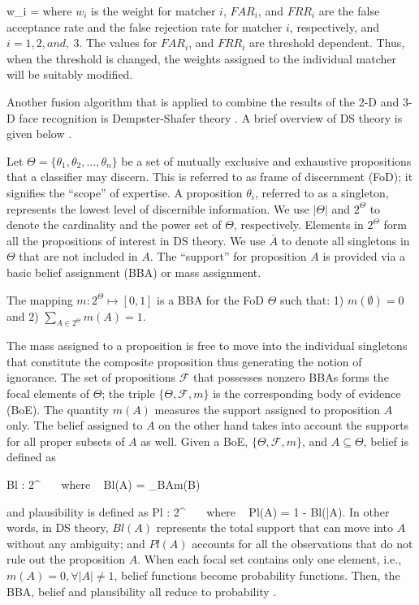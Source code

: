 \beq \label{eq_fusion_weights}\displaystyle w_i =  \eeq where $w_i$ is the
weight for matcher $i$, $FAR_i$, and $FRR_i$ are the false
acceptance rate and the false rejection rate for matcher $i$,
respectively, and $i = 1, 2, and,~ 3$. The values for $FAR_i$, and
$FRR_i$ are threshold dependent. Thus, when the threshold is
changed, the weights assigned to the individual matcher will be
suitably modified.

Another fusion algorithm that is applied to combine the results of
the 2-D and 3-D face recognition is Dempster-Shafer theory
\cite{Shafer76}. A brief overview of DS theory is given below
\cite{premaratne07}.

Let $\Theta = \{\theta_1, \theta_2, ..., \theta_n\}$ be a set of
mutually exclusive and exhaustive propositions that a classifier may
discern. This is referred to as frame of discernment (FoD); it
signifies the ``scope'' of expertise. A proposition $\theta_i$,
referred to as a singleton, represents the lowest level of
discernible information. We use $|\Theta|$ and $2^\Theta$ to denote
the cardinality and the power set of $\Theta$, respectively.
Elements in $2^{\Theta}$ form all the propositions of interest in DS
theory. We use $\bar{A}$ to denote all singletons in $\Theta$ that
are not included in $A$. The ``support'' for proposition $A$ is
provided via a basic belief assignment (BBA) or mass assignment.

The mapping $m : 2^\Theta \longmapsto [0, 1]$ is a BBA for the FoD
$\Theta$ such that: 1) $m(\emptyset) = 0$ and 2) $\sum_{A
\in2^\Theta}m(A) = 1$.

The mass assigned to a proposition is free to move into the
individual singletons that constitute the composite proposition thus
generating the notion of ignorance. The set of propositions
$\mathcal{F}$ that possesses nonzero BBAs forms the focal elements
of $\Theta$; the triple $\{\Theta,\mathcal{F},m\}$ is the
corresponding body of evidence (BoE). The quantity $m(A)$ measures
the support assigned to proposition $A$ only. The belief assigned to
$A$ on the other hand takes into account the supports for all proper
subsets of $A$ as well. Given a BoE, $\{\Theta,\mathcal{F},m\}$, and
$A \subseteq \Theta$, belief is defined as

\beq Bl : 2^\Theta \longmapsto [0, 1] ~~~ where ~ Bl(A) =
\sum_{B\subseteq A}m(B) \eeq

and plausibility is defined as \beq Pl : 2^\Theta \longmapsto [0, 1]
~~~ where ~ Pl(A) = 1 - Bl(\bar{A}). \eeq In other words, in DS
theory, $Bl(A)$ represents the total support that can move into $A$
without any ambiguity; and $Pl(A)$ accounts for all the observations
that do not rule out the proposition $A$. When each focal set
contains only one element, i.e., $m(A) = 0, \forall|A|\neq 1$,
belief functions become probability functions. Then, the BBA, belief
and plausibility all reduce to probability \cite{premaratne04}.

